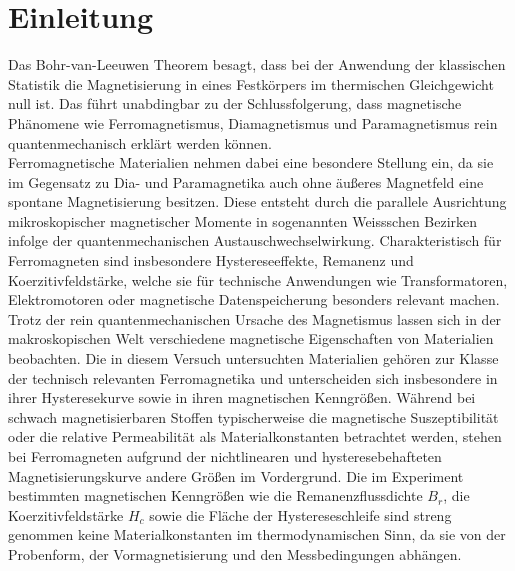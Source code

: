 \section{Einleitung}
Das Bohr-van-Leeuwen Theorem besagt, dass bei der Anwendung der klassischen Statistik die Magnetisierung
in eines Festkörpers im thermischen Gleichgewicht null ist. Das führt unabdingbar zu der Schlussfolgerung, dass
magnetische Phänomene wie Ferromagnetismus, Diamagnetismus und Paramagnetismus rein quantenmechanisch
erklärt werden können. \\
Ferromagnetische Materialien nehmen dabei eine besondere Stellung ein,
da sie im Gegensatz zu Dia- und Paramagnetika auch ohne äußeres
Magnetfeld eine spontane Magnetisierung besitzen. Diese entsteht durch
die parallele Ausrichtung mikroskopischer magnetischer Momente in
sogenannten Weissschen Bezirken infolge der quantenmechanischen
Austauschwechselwirkung. Charakteristisch für Ferromagneten sind
insbesondere Hystereseeffekte, Remanenz und Koerzitivfeldstärke,
welche sie für technische Anwendungen wie Transformatoren,
Elektromotoren oder magnetische Datenspeicherung besonders relevant
machen.\\
Trotz der rein quantenmechanischen Ursache des Magnetismus lassen sich in der makroskopischen Welt
verschiedene magnetische Eigenschaften von Materialien beobachten. 
Die in diesem Versuch untersuchten Materialien gehören zur Klasse
der technisch relevanten Ferromagnetika und unterscheiden sich
insbesondere in ihrer Hysteresekurve sowie in ihren magnetischen
Kenngrößen. Während bei schwach magnetisierbaren Stoffen typischerweise
die magnetische Suszeptibilität oder die relative Permeabilität als
Materialkonstanten betrachtet werden, stehen bei Ferromagneten aufgrund
der nichtlinearen und hysteresebehafteten Magnetisierungskurve andere
Größen im Vordergrund.
Die im Experiment bestimmten magnetischen Kenngrößen wie die Remanenzflussdichte
\( B_r \), die Koerzitivfeldstärke \( H_c \) sowie die Fläche der
Hystereseschleife sind streng genommen keine Materialkonstanten im
thermodynamischen Sinn, da sie von der Probenform, der
Vormagnetisierung und den Messbedingungen abhängen.